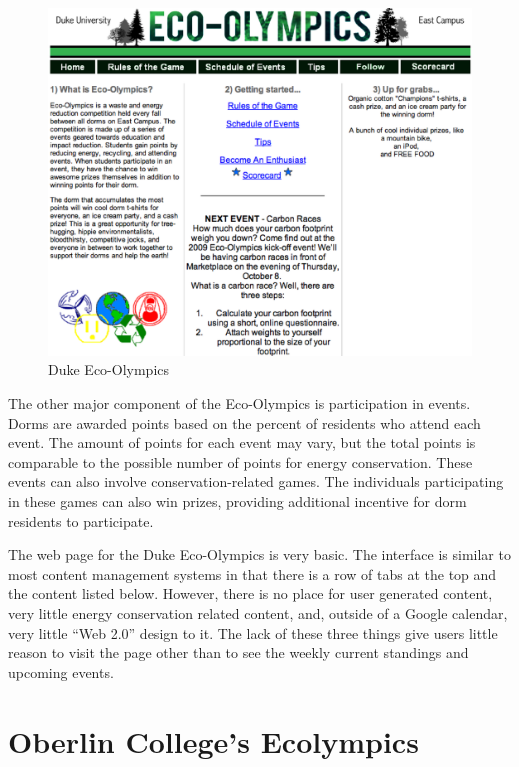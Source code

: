 \begin{figure}
	\centering
	\includegraphics[scale=0.25]{images/duke-ecolympics.eps}
	\caption{Duke Eco-Olympics}
\end{figure}

The other major component of the Eco-Olympics is participation in events.  Dorms are awarded points based on the percent of residents who attend each event.  The amount of points for each event may vary, but the total points is comparable to the possible number of points for energy conservation.  These events can also involve conservation-related games.  The individuals participating in these games can also win prizes, providing additional incentive for dorm residents to participate.

The web page for the Duke Eco-Olympics is very basic.  The interface is similar to most content management systems in that there is a row of tabs at the top and the content listed below.  However, there is no place for user generated content, very little energy conservation related content, and, outside of a Google calendar, very little ``Web 2.0'' design to it.  The lack of these three things give users little reason to visit the page other than to see the weekly current standings and upcoming events.

\section{Oberlin College's Ecolympics}
\label{oberlin-ecolympics}

